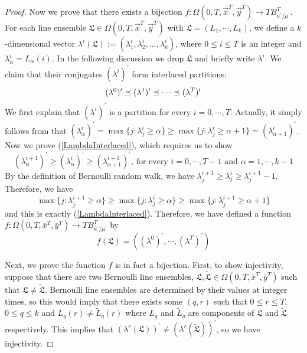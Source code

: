 \begin{proof}
Now we prove that there exists a bijection $f:\Omega(0,T,\vec{x}^T,\vec{y}^{T})\rightarrow TB_{\kappa^{\prime}/\mu^{\prime}}^{T}$. For each line ensemble $\mathfrak{L}\in \Omega(0,T,\vec x^T,\vec y^T)$ with $\mathfrak{L}=(L_1,\cdots,L_k)$, we define a $k$-dimensional vector $\lambda^{i}(\mathfrak{L}):=(\lambda_{1}^{i},\lambda_{2}^{i},...,\lambda_{k}^{i})$, where $0 \leq i\leq T$ is an integer and $\lambda_{\alpha}^{i}=L_{\alpha}(i)$. In the following discussion we drop $\mathfrak{L}$ and briefly write $\lambda^{i}$. We claim that their conjugates $(\lambda^{i})^{\prime}$ form interlaced partitions:
\begin{equation}{\label{LambdaInterlaced}}
	(\lambda^{0})^{\prime}\preceq(\lambda^{1})^{\prime}\preceq\cdots\preceq(\lambda^{T})^{\prime}
\end{equation}
We first explain that $(\lambda^{i})^{\prime}$ is a partition for every $i=0,\cdots,T$. Actually, it simply follows from that $(\lambda^{i}_{\alpha})^{\prime}=\max\{j:\lambda_{j}^{i}\geq \alpha\}\geq \max\{j:\lambda_{j}^{i}\geq \alpha+1\}=(\lambda^{i}_{\alpha+1})^{\prime}$. Now we prove (\ref{LambdaInterlaced}), which requires us to show
\begin{equation*}
	(\lambda^{i+1}_{\alpha})^{\prime}\geq (\lambda^{i}_{\alpha})^{\prime}\geq (\lambda^{i+1}_{\alpha+1})^{\prime}\text{, for every } i=0,\cdots, T-1 \text{ and }\alpha=1,\cdots, k-1 
\end{equation*}
By the definition of Bernoulli random walk, we have $\lambda_{j}^{i+1}\geq\lambda_{j}^{i}\geq\lambda_{j}^{i+1}-1$. Therefore, we have 
\begin{equation*}
	\max\{j:\lambda_{j}^{i+1}\geq \alpha\}\geq\max\{j:\lambda_{j}^{i}\geq \alpha\}\geq\max\{j:\lambda_{j}^{i+1}\geq \alpha+1\}
\end{equation*}
and this is exactly (\ref{LambdaInterlaced}).
Therefore, we have defined a function $f:\Omega(0,T,\bar x^T, \bar y ^T)\to TB_{\kappa^{\prime}/\mu^{\prime}}^T$ by
\begin{equation}
	f(\mathfrak{L})=\left((\lambda^{0})^{\prime},\cdots,(\lambda^{T})^{\prime}\right)
\end{equation}

Next, we prove the function $f$ is in fact a bijection. First, to show injectivity, suppose that there are two Bernoulli line ensembles, $\mathfrak{L}, \widetilde{\mathfrak{L}}\in \Omega(0,T,\bar x^T, \bar y ^T)$ such that $\mathfrak{L}\neq \widetilde{\mathfrak{L}}$.
Bernoulli line ensembles are determined by their values at integer times, so this would imply that there exists some $(q,r)$ such that $0\leq r\leq T$, $0\leq q \leq k$ and $L_q(r)\neq \widetilde{L}_q(r)$ where $L_q$ and $\widetilde{L}_q$ are components of $\mathfrak{L}$ and $\widetilde{\mathfrak{L}}$ respectively. This implies that $\left(\lambda^r(\mathfrak{L})\right)^{\prime}\neq \left(\lambda^r(\widetilde{\mathfrak{L}})\right)^{\prime}$, so we have injectivity. 


\end{proof}
